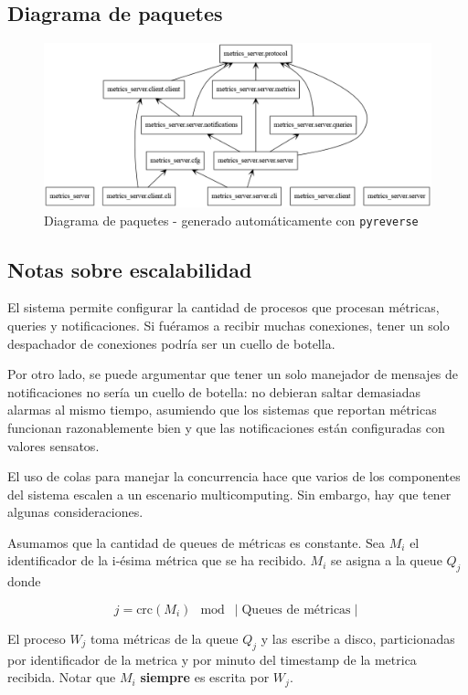 \documentclass[a4paper,oneside]{article}
\begin{document}
\subsection{Diagrama de paquetes}
\begin{figure}[H]
\centering
\includegraphics[width=\textwidth]{images/packages.png}
\caption{Diagrama de paquetes - generado automáticamente con \texttt{pyreverse}}
\end{figure}

\subsection{Notas sobre escalabilidad}
El sistema permite configurar la cantidad de procesos que procesan métricas, queries y notificaciones. Si fuéramos a recibir muchas conexiones, tener un solo despachador de conexiones podría ser un cuello de botella.

Por otro lado, se puede argumentar que tener un solo manejador de mensajes de notificaciones no sería un cuello de botella: no debieran saltar demasiadas alarmas al mismo tiempo, asumiendo que los sistemas que reportan métricas funcionan razonablemente bien y que las notificaciones están configuradas con valores sensatos.

El uso de colas para manejar la concurrencia hace que varios de los componentes del sistema escalen a un escenario multicomputing. Sin embargo, hay que tener algunas consideraciones.

Asumamos que la cantidad de queues de métricas es constante. Sea $M_i$ el identificador de la i-ésima métrica que se ha recibido. $M_i$ se asigna a la queue $Q_j$ donde

\begin{equation}\label{crcindex}
	j = \text{crc}(M_i) \mod \mid \text{Queues de métricas} \mid
\end{equation}

El proceso $W_j$ toma métricas de la queue $Q_j$ y las escribe a disco, particionadas por identificador de la metrica y por minuto del timestamp de la metrica recibida. Notar que $M_i$ \textbf{siempre} es escrita por $W_j$.
\end{document}

